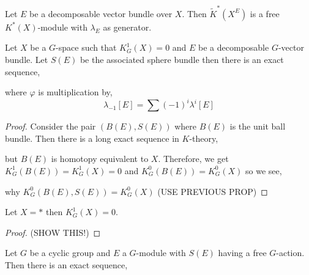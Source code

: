 \documentclass[12pt]{extarticle}
\begin{document}
\begin{prop}
Let $E$ be a decomposable vector bundle over $X$. Then $\tilde{K}^*(X^E)$ is a free $K^*(X)$-module with $\lambda_E$ as generator.
\end{prop}

\begin{theorem}
Let $X$ be a $G$-space such that $K^1_G(X) = 0$ and $E$ be a decomposable $G$-vector bundle. Let $S(E)$ be the associated sphere bundle then there is an exact sequence,
\begin{center}
\end{center}
where $\varphi$ is multiplication by,
\[ \lambda_{-1} [E] = \sum (-1)^i \lambda^i [E] \]
\end{theorem}

\begin{proof}
Consider the pair $(B(E), S(E))$ where $B(E)$ is the unit ball bundle. Then there is a long exact sequence in $K$-theory,
\begin{center}
\end{center}
but $B(E)$ is homotopy equivalent to $X$. Therefore, we get $K^1_G(B(E)) = K^1_G(X) = 0$ and $K^0_G(B(E)) = K^0_G(X)$ so we see,
\begin{center}
\end{center}
why $K_G^0(B(E), S(E)) = K_G^0(X)$ (USE PREVIOUS PROP)
\end{proof}

\begin{prop}
Let $X = *$ then $K^1_G(X) = 0$. 
\end{prop}

\begin{proof}
(SHOW THIS!)
\end{proof}

\begin{cor}
Let $G$ be a cyclic group and $E$ a $G$-module with $S(E)$ having a free $G$-action. Then there is an exact sequence,
\begin{center}
\end{center}
\end{cor}
\end{document}

